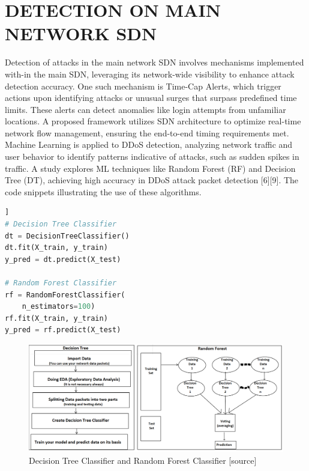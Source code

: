 \documentclass[conference]{IEEEtran}
\begin{document}
\section{DETECTION ON MAIN NETWORK SDN}
Detection of attacks in the main network SDN involves mechanisms implemented with-in the main SDN, leveraging its network-wide visibility to enhance attack detection accuracy. One such mechanism is Time-Cap Alerts, which trigger actions upon identifying attacks or unusual surges that surpass predefined time limits. These alerts can detect anomalies like login attempts from unfamiliar locations. A proposed framework utilizes SDN architecture to optimize real-time network flow management, ensuring the end-to-end timing requirements met. Machine Learning is applied to DDoS detection, analyzing network traffic and user behavior to identify patterns indicative of attacks, such as sudden spikes in traffic. A study explores ML techniques like Random Forest (RF) and Decision Tree (DT), achieving high accuracy in DDoS attack packet detection [6][9]. The code snippets illustrating the use of these algorithms.


\lstset{basicstyle=\small, basewidth=0.5em}
\begin{minipage}{0.8\linewidth}
\begin{lstlisting}[language=Python, caption=Decision Tree and Random Forest Classifiers [sourCE]]
# Decision Tree Classifier
dt = DecisionTreeClassifier()
dt.fit(X_train, y_train)
y_pred = dt.predict(X_test)

# Random Forest Classifier
rf = RandomForestClassifier(
    n_estimators=100)
rf.fit(X_train, y_train)
y_pred = rf.predict(X_test)
\end{lstlisting}
\end{minipage}
\begin{figure}[h]
\includegraphics[scale=0.36]{fig3.png}
\caption{Decision Tree Classifier and Random Forest Classifier [source]}
\end{figure}
\end{document}
